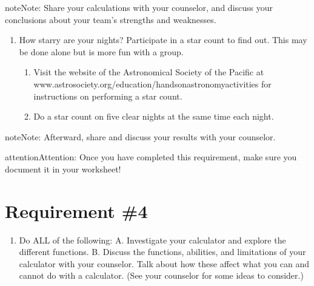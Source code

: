 \documentclass[letterpaper,10pt,english]{sphinxmanual}
\begin{document}
\begin{sphinxadmonition}{note}{Note:}
Share your calculations with your counselor, and discuss your conclusions about your team’s strengths and weaknesses.
\end{sphinxadmonition}
\begin{enumerate}
%
\setcounter{enumi}{4}
\item {} 
How starry are your nights? Participate in a star count to find out. This may be done alone but is more fun with a group.
\begin{enumerate}
%
\item {} 
Visit the website of the Astronomical Society of the Pacific at www.astrosociety.org/education/hands\sphinxhyphen{}on\sphinxhyphen{}astronomy\sphinxhyphen{}activities for instructions on performing a star count.

\item {} 
Do a star count on five clear nights at the same time each night.

\end{enumerate}

\end{enumerate}

\begin{sphinxadmonition}{note}{Note:}
Afterward, share and discuss your results with your counselor.
\end{sphinxadmonition}

\begin{sphinxadmonition}{attention}{Attention:}
Once you have completed this requirement, make sure you document it in your worksheet!
\end{sphinxadmonition}


\chapter{Requirement \#4}
\label{\detokenize{requirement4:requirement-4}}\label{\detokenize{requirement4::doc}}\begin{enumerate}
%
\setcounter{enumi}{3}
\item {} 
Do ALL of the following:
A. Investigate your calculator and explore the different functions.
B. Discuss the functions, abilities, and limitations of your calculator with your counselor. Talk about how these affect what you can and cannot do with a calculator. (See your counselor for some ideas to consider.)

\end{enumerate}
\end{document}
